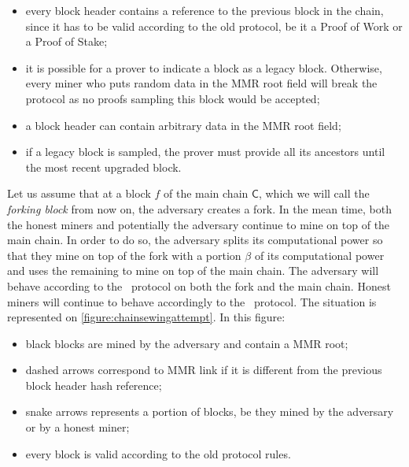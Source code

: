       \begin{itemize}
        \item every block header contains a reference to the previous block in the chain, since it has to be valid according to the old protocol, be it a Proof of Work or a Proof of Stake;
        \item it is possible for a prover to indicate a block as a legacy block. Otherwise, every miner who puts random data in the MMR root field will break the protocol as no proofs sampling this block would be accepted;
        \item a block header can contain arbitrary data in the MMR root field;
        \item if a legacy block is sampled, the prover must provide all its ancestors until the most recent upgraded block.
      \end{itemize}
      
      Let us assume that at a block \(f\) of the main chain \(\mathsf{C}\), which we will call the \textit{forking block} from now on, the adversary creates a fork. In the mean time, both the honest miners and potentially the adversary continue to mine on top of the main chain. In order to do so, the adversary splits its computational power so that they mine on top of the fork with a portion \(\beta\) of its computational power and uses the remaining to mine on top of the main chain. The adversary will behave according to the \FC\ protocol on both the fork and the main chain. Honest miners will continue to behave accordingly to the \FC\ protocol. The situation is represented on \autoref{figure:chainsewingattempt}. In this figure:
      
      \begin{itemize}
        \item black blocks are mined by the adversary and contain a MMR root;
        \item dashed arrows correspond to MMR link if it is different from the previous block header hash reference;
        \item snake arrows represents a portion of blocks, be they mined by the adversary or by a honest miner;
        \item every block is valid according to the old protocol rules.
      \end{itemize}
    
